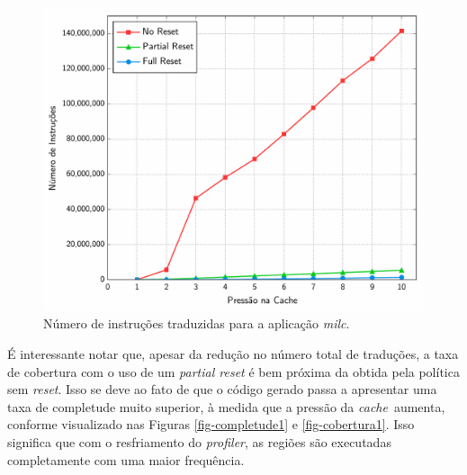 \documentclass[12pt,twoside]{article}
\newcommand{\cache}{\emph{cache}}
\begin{document}
\begin{figure}[!ht]
\centering
\includegraphics[scale=0.5]{./figs/reset-translate-inst}
\caption{Número de instruções traduzidas para a aplicação \emph{milc}.}
\label{fig-milc-trans-freq}
\end{figure}


É interessante notar que, apesar da redução no número total de traduções, a taxa de cobertura com o uso de um \emph{partial reset} é bem próxima da obtida pela política sem \emph{reset}. Isso se deve ao fato de que o código gerado passa a apresentar uma taxa de completude muito superior, à medida que a pressão da \cache~aumenta, conforme visualizado nas Figuras \ref{fig-completude1} e  \ref{fig-cobertura1}. Isso significa que com o resfriamento do \emph{profiler}, as regiões são executadas completamente com uma maior frequência.
\end{document}
